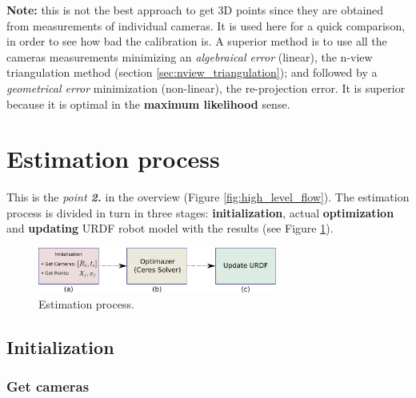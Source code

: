 \noindent
\textbf{Note:} this is not the best approach to get 3D points since they are obtained from measurements of individual cameras. It is used here for a quick comparison, in order to see how bad the calibration is. A superior method is to use all the cameras measurements minimizing an \textit{algebraical error} (linear), the n-view triangulation method (section \ref{sec:nview_triangulation}); and followed by a \textit{geometrical error} minimization (non-linear), the re-projection error. It is superior because it is optimal in the \textbf{maximum likelihood} sense.

\section{Estimation process}
\label{sec:estimation}

This is the \textit{point \textbf{2.}} in the overview (Figure \ref{fig:high_level_flow}).
The estimation process is divided in turn in three stages: \textbf{initialization}, actual \textbf{optimization} and \textbf{updating} URDF robot model with the results (see Figure \ref{fig:optimization}).

\begin{figure}[!htbp]
 \centering
 \includegraphics[width=0.7\textwidth]{images/optimization.pdf}
 \caption{Estimation process.}
 \label{fig:optimization}
\end{figure}

%


\subsection{Initialization}
\label{sec:initialization}

\subsubsection*{Get cameras}

